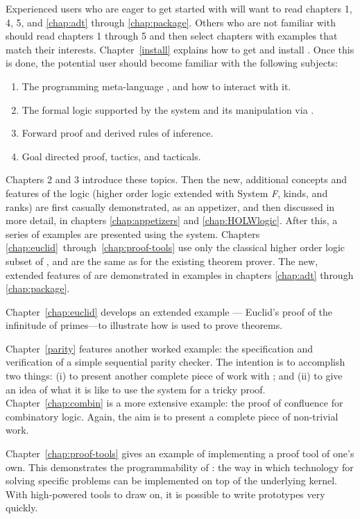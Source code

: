 Experienced \HOL{} users who are eager to get started with \HOLW{}
will want to read chapters 1, 4, 5, and
\ref{chap:adt} through \ref{chap:package}.
Others who are not familiar with \HOL{} should read chapters 1 through 5
and then select chapters with examples that match their interests.
Chapter~\ref{install} explains how to get and install \HOLW.  Once this
is done, the potential \HOLW{} user should become familiar with the
following subjects:
%
\begin{enumerate}
\item The programming meta-language \ML, and how to interact with it.
\item The formal logic supported by the \HOLW{} system
  and its manipulation via \ML.
\item Forward proof and derived rules of inference.
\item Goal directed proof, tactics, and tacticals.
\end{enumerate}
%
Chapters 2 and 3 introduce these topics. Then the new, additional
concepts and features of the \HOLW{} logic (higher order logic 
extended with System {\it F}, kinds, and ranks)
are first casually demonstrated, as an appetizer, and then
discussed in more detail, in chapters \ref{chap:appetizers} and \ref{chap:HOLWlogic}. 
After this, a series of examples are presented using the \HOLW{} system.
Chapters \ref{chap:euclid}~through~\ref{chap:proof-tools} use only the
classical higher order logic subset of \HOLW, and are
the same as for the existing \HOL{} theorem prover.
The new, extended features of \HOLW{} are demonstrated in
examples in chapters \ref{chap:adt} through \ref{chap:package}.

Chapter~\ref{chap:euclid} develops an extended example --- Euclid's
proof of the infinitude of primes---to illustrate how \HOLW{} is used
to prove theorems.


Chapter~\ref{parity} features another worked example: the specification
and verification of a simple sequential parity checker.  The intention
is to accomplish two things: (i) to present another complete piece of
work with \HOLW; and (ii) to give an idea of what it is like to use the
\HOLW{} system for a tricky proof.  Chapter~\ref{chap:combin} is a more
extensive example: the proof of confluence for combinatory
logic.  Again, the aim is to present a complete piece of non-trivial
work.

Chapter~\ref{chap:proof-tools} gives an example of implementing a
proof tool of one's own.  This demonstrates the programmability of
\HOLW: the way in which technology for solving specific problems can be
implemented on top of the underlying kernel.  With high-powered tools
to draw on, it is possible to write prototypes very quickly.

